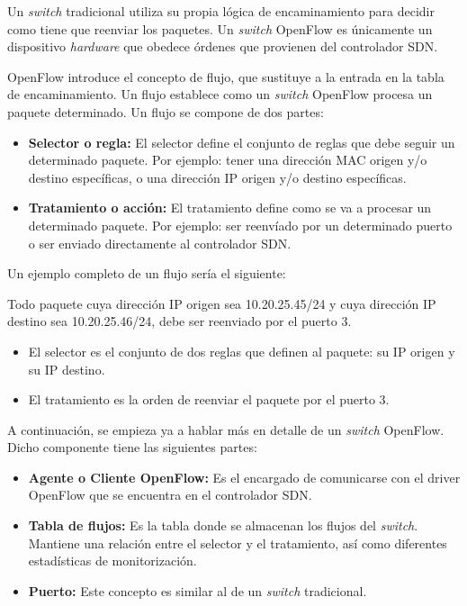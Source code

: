 Un \textit{switch} tradicional utiliza su propia lógica de encaminamiento para decidir como tiene que reenviar los paquetes. Un \textit{switch} OpenFlow es únicamente un dispositivo \textit{hardware} que obedece órdenes que provienen del controlador SDN.

OpenFlow introduce el concepto de flujo, que sustituye a la entrada en la tabla de encaminamiento. Un flujo establece como un \textit{switch} OpenFlow procesa un paquete determinado. Un flujo se compone de dos partes:

\begin{itemize}
	\item \textbf{Selector o regla:} El selector define el conjunto de reglas que debe seguir un determinado paquete. Por ejemplo: tener una dirección MAC origen y/o destino específicas, o una dirección IP origen y/o destino específicas. 
	
	\item \textbf{Tratamiento o acción:} El tratamiento define como se va a procesar un determinado paquete. Por ejemplo: ser reenvíado por un determinado puerto o ser enviado directamente al controlador SDN.
\end{itemize}

Un ejemplo completo de un flujo sería el siguiente:

Todo paquete cuya dirección IP origen sea 10.20.25.45/24 y cuya dirección IP destino sea 10.20.25.46/24, debe ser reenviado por el puerto 3.

\begin{itemize}
	\item El selector es el conjunto de dos reglas que definen al paquete: su IP origen y su IP destino.
	
	\item 	El tratamiento es la orden de reenviar el paquete por el puerto 3.
\end{itemize}
	
A continuación, se empieza ya a hablar más en detalle de un \textit{switch} OpenFlow. Dicho componente tiene las siguientes partes:

\begin{itemize}
	\item \textbf{Agente o Cliente OpenFlow:} Es el encargado de comunicarse con el driver OpenFlow que se encuentra en el controlador SDN.
	
	\item \textbf{Tabla de flujos:} Es la tabla donde se almacenan los flujos del \textit{switch}. Mantiene una relación entre el selector y el tratamiento, así como diferentes estadísticas de monitorización.
	
	\item \textbf{Puerto:} Este concepto es similar al de un \textit{switch} tradicional.
\end{itemize}

